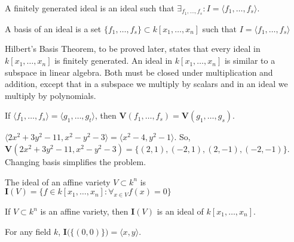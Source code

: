                 \begin{definition}
                    A finitely generated ideal is an ideal
                    such that
                    $\exists_{f_1,\hdots, f_s}:I=\langle f_1,\hdots, f_s\rangle$.
                \end{definition}
                \begin{definition}
                    A basis of an ideal is a set
                    $\{f_1,\hdots, f_s\}\subset k[x_1,\hdots ,x_n]$
                    such that $I=\langle f_{1},\hdots,f_{s}\rangle$
                \end{definition}
                Hilbert's Basis Theorem, to be proved later, states
                that every ideal in $k[x_{1},\hdots,x_{n}]$ is finitely
                generated. An ideal in $k[x_{1},\hdots,x_{n}]$ is similar
                to a subspace in linear algebra. Both must be closed
                under multiplication and addition, except that in a
                subspace we multiply by scalars and in an ideal
                we multiply by polynomials. 
                \begin{theorem}
                    If $\langle f_1,\hdots,f_s\rangle=\langle g_1,\hdots,g_t\rangle$,
                    then $\mathbf{V}(f_1,\hdots, f_s)=\mathbf{V}(g_1,\hdots, g_s)$.
                \end{theorem}
                \begin{example}
                    $\langle2x^2+3y^2-11,x^2-y^2-3\rangle%
                     =\langle x^2-4,y^2-1\rangle$.
                    So,
                    $\mathbf{V}(2x^2+3y^2-11,x^2-y^2-3)%
                     =\{(2,1),(-2,1),(2,-1),(-2,-1)\}$.
                    Changing basis simplifies the problem.
                \end{example}
                \begin{definition}
                    The ideal of an affine variety
                    $V\subset k^n$ is
                    $\mathbf{I}(V)%
                     =\{f\in k[x_1,\hdots ,x_n]:\forall_{x\in V}f(x)=0\}$
                \end{definition}
                \begin{theorem}
                    If $V\subset k^n$ is an affine variety,
                    then $\mathbf{I}(V)$ is an ideal of
                    $k[x_1,\hdots ,x_n]$.
                \end{theorem}
                \begin{theorem}
                    For any field $k$,
                    $\mathbf{I}\big(\{(0,0)\}\big)=\langle x,y\rangle$.
                \end{theorem}
